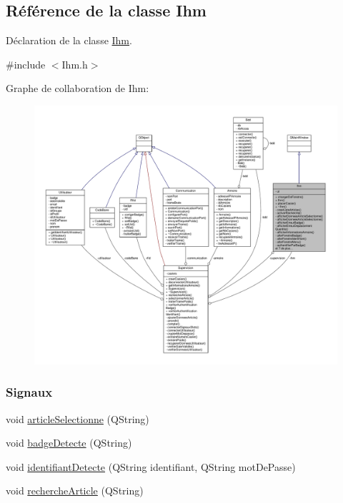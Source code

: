 \hypertarget{class_ihm}{}\subsection{Référence de la classe Ihm}
\label{class_ihm}


Déclaration de la classe \hyperlink{class_ihm}{Ihm}.  




{\ttfamily \#include $<$Ihm.\+h$>$}



Graphe de collaboration de Ihm\+:
\nopagebreak
\begin{figure}[H]
\begin{center}
\leavevmode
\includegraphics[width=350pt]{class_ihm__coll__graph}
\end{center}
\end{figure}
\subsubsection*{Signaux}
\begin{DoxyCompactItemize}
\item 
void \hyperlink{class_ihm_aef14440b8cc3c9ec92289199ecb7c32f}{article\+Selectionne} (Q\+String)
\item 
void \hyperlink{class_ihm_a15daf0d4cd7c9afd6c97788e54328133}{badge\+Detecte} (Q\+String)
\item 
void \hyperlink{class_ihm_a7cbb2cb835ec643c0a673082d2956405}{identifiant\+Detecte} (Q\+String identifiant, Q\+String mot\+De\+Passe)
\item 
void \hyperlink{class_ihm_a3805ec42b0de42e9210b9561b08f3ecd}{recherche\+Article} (Q\+String)
\end{DoxyCompactItemize}
